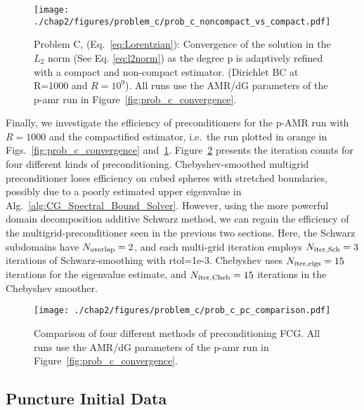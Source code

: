 \begin{figure}[ht!]
  \centering
  \texttt{[image: ./chap2/figures/problem\_c/prob\_c\_noncompact\_vs\_compact.pdf]}
  \caption{ \label{fig:prob_c_noncompact_vs_compact} Problem C,
    (Eq.~\ref{eq:Lorentzian}): Convergence of the solution in the
    $L_2$ norm (See Eq. \ref{eq:l2norm}) as the degree p is adaptively
    refined with a compact and non-compact estimator.  (Dirichlet BC
    at R=1000 and $R=10^9$).  All runs use the AMR/dG parameters of
    the p-amr run in Figure~\ref{fig:prob_c_convergence}.  }
\end{figure}


Finally, we investigate the efficiency of preconditioners for the
p-AMR run with $R=1000$ and the compactified estimator, i.e.\ the run plotted in orange in Figs.~\ref{fig:prob_c_convergence}
  and~\ref{fig:prob_c_noncompact_vs_compact}.
Figure~\ref{fig:prob_c_pc_comparison} presents the iteration counts
for four different kinds of preconditioning.
Chebyshev-smoothed multigrid
preconditioner loses
  efficiency on cubed spheres with stretched boundaries, possibly due
to a poorly estimated upper eigenvalue in
Alg.~\ref{alg:CG_Spectral_Bound_Solver}. However, using the more
powerful domain decomposition additive Schwarz method, we can regain
the efficiency of the multigrid-preconditioner seen in the previous
two sections.  Here, the Schwarz subdomains have $N_{\rm
    overlap}=2$, and each multi-grid iteration employs $N_{\rm iter,
    Sch}=3$ iterations of Schwarz-smoothing with rtol=1e-3.  Chebyshev
  uses $N_{\rm iter,eigs}=15$ iterations for the eigenvalue estimate,
  and $N_{\rm iter,Cheb}=15$ iterations in the Chebyshev smoother.

\begin{figure}[ht!]
  \centering
  \texttt{[image: ./chap2/figures/problem\_c/prob\_c\_pc\_comparison.pdf]}
  \caption{ \label{fig:prob_c_pc_comparison} Comparison of four
    different methods of preconditioning FCG.  All runs use the AMR/dG
    parameters of the p-amr run in
    Figure~\ref{fig:prob_c_convergence}.
  }
\end{figure}

\subsection{Puncture Initial Data}
\label{sec:punctureinitialdata}

